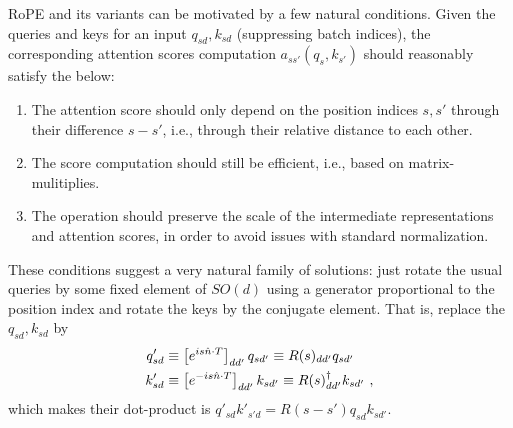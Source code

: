 \documentclass[11pt]{article}
\begin{document}
RoPE and its variants can be motivated by a few natural conditions.  Given the queries and keys for
an input $ q _{ sd }, k _{ sd } $ (suppressing batch indices), the corresponding attention scores
computation $ a _{ ss' }\left ( q _{ s }, k _{ s' } \right ) $ should reasonably satisfy the below:
\begin{enumerate}
	\item The attention score should only depend on the position indices $ s, s' $ through their difference
	      $ s-s' $, i.e., through their relative distance to each other.
	\item The score computation should still be efficient, i.e., based on matrix-mulitiplies.
	\item The operation should preserve the scale of the intermediate representations and attention
	      scores, in order to avoid issues with standard normalization.
\end{enumerate}
These conditions suggest a very natural family of solutions: just rotate the usual queries by some fixed
element of $ SO(d) $ using a generator proportional to the position index and rotate the keys by the
conjugate element. That is, replace the $ q _{ sd }, k _{ sd } $   by
\begin{align}
    q' _{ sd }&\equiv  \left [e^{ i s \hat{n}\cdot T }\right ]_{ d d' } q _{ sd' } \equiv R(s) _{ d d' } q _{ sd' } \nonumber\\
    k' _{ sd }&\equiv  \left [e^{ -i s \hat{n}\cdot T }\right ]_{ d d' } k _{ sd' } \equiv  R(s)^{ \dagger } _{ d d' } k _{ sd' } \ , \label{eq_rope}
\end{align}
which makes their dot-product is $ q' _{ sd } k' _{ s'd } = R(s-s') q _{ sd } k _{ sd' }  $.
\end{document}
